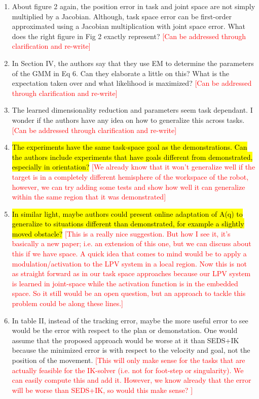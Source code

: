 \documentclass[10pt,stdletter,dateno]{newlfm}
\begin{document}
\begin{newlfm}
\begin{enumerate}
\item About figure 2 again, the position error in task and joint space are
not simply multiplied by a Jacobian. Although, task space error can be
first-order approximated using a Jacobian multiplication with joint
space error. What does the right figure in Fig 2 exactly represent? \textcolor{red}{[Can be addressed through clarification and re-write]}


\item In Section IV, the authors say that they use EM to determine the
parameters of the GMM in Eq 6. Can they elaborate a little on this?
What is the expectation taken over and what likelihood is maximized? \textcolor{red}{[Can be addressed through clarification and re-write]}


\item The learned dimensionality reduction and parameters seem task
dependant. I wonder if the authors have any idea on how to generalize
this across tasks. \textcolor{red}{[Can be addressed through clarification and re-write]}


\item \hl{The experiments have the same task-space goal as the
demonstrations. Can the authors include experiments that have goals
different from demonstrated, especially in orientation?} \textcolor{red}{[We already know that it won't generalize well if the target is in a completely different hemisphere of the workspace of the robot, however, we can try adding some tests and show how well it can generalize within the same region that it was demonstrated]}

\item \hl{In similar light, maybe authors could present online adaptation of
A(q) to generalize to situations different than demonstrated, for
example a slightly moved obstacle?} \textcolor{red}{[This is a really nice suggestion. But how I see it, it's basically a new paper; i.e. an extension of this one, but we can discuss about this if we have space. A quick idea that comes to mind would be to apply a modulation/activation to the LPV system in a local region. Now this is not as straight forward as in our task space approaches because our LPV system is learned in joint-space while the activation function is in the embedded space. So it still would be an open question, but an approach to tackle this problem could be along these lines.]}

\item In table II, instead of the tracking error, maybe the more useful
error to see would be the error with respect to the plan or
demonstation. One would assume that the proposed approach would be
worse at it than SEDS+IK because the minimized error is with respect to
the velocity and goal, not the position of the movement. \textcolor{red}{[This will only make sense for the tasks that are actually feasible for the IK-solver (i.e. not for foot-step or singularity). We can easily compute this and add it. However, we know already that the error will be worse than SEDS+IK, so would this make sense? ]}


\end{enumerate}
\end{newlfm}
\end{document}
